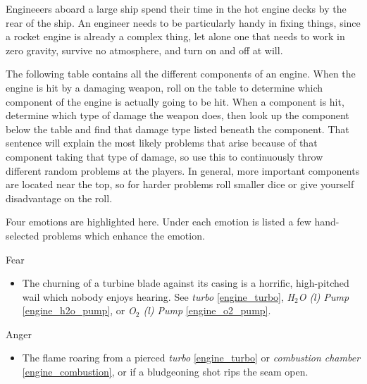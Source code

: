 \documentclass[a4paper]{article}
\begin{document}
Engineeers aboard a large ship spend their time in the hot engine decks by the rear of the ship. An engineer needs to be particularly handy in fixing things, since a rocket engine is already a complex thing, let alone one that needs to work in zero gravity, survive no atmosphere, and turn on and off at will.

The following table contains all the different components of an engine. When the engine is hit by a damaging weapon, roll on the table to determine which component of the engine is actually going to be hit. When a component is hit, determine which type of damage the weapon does, then look up the component below the table and find that damage type listed beneath the component. That sentence will explain the most likely problems that arise because of that component taking that type of damage, so use this to continuously throw different random problems at the players. In general, more important components are located near the top, so for harder problems roll smaller dice or give yourself disadvantage on the roll.

Four emotions are highlighted here. Under each emotion is listed a few hand-selected problems which enhance the emotion.

\vspace{0.3cm}
\begin{minipage}[t]{0.4\linewidth}
Fear
\begin{itemize}
\item The churning of a turbine blade against its casing is a horrific, high-pitched wail which nobody enjoys hearing. See \textit{turbo} \ref{engine_turbo}, \textit{H$_2$O (l) Pump} \ref{engine_h2o_pump}, or \textit{O$_2$ (l) Pump} \ref{engine_o2_pump}.
\end{itemize}
\end{minipage} 
\begin{minipage}[t]{0.4\linewidth}
Anger
\begin{itemize}
\item The flame roaring from a pierced \textit{turbo} \ref{engine_turbo} or \textit{combustion chamber} \ref{engine_combustion}, or if a bludgeoning shot rips the seam open. 
\end{itemize}
\end{minipage}
\end{document}
